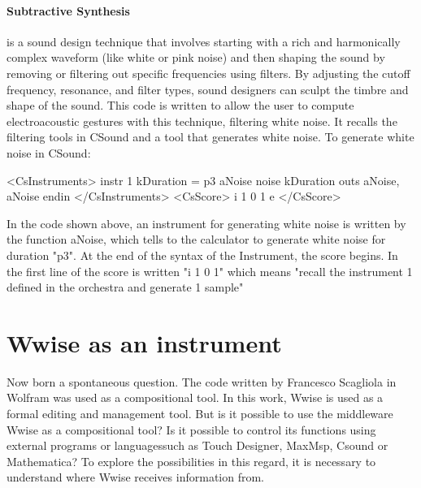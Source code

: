 		\paragraph{Subtractive Synthesis} is a sound design technique that involves starting with a rich and harmonically complex waveform (like white or pink noise) and then shaping the sound by removing or filtering out specific frequencies using filters. By adjusting the cutoff frequency, resonance, and filter types, sound designers can sculpt the timbre and shape of the sound.
		This code is written to allow the user to compute electroacoustic gestures with this technique, filtering white noise. It recalls the filtering tools in CSound and a tool that generates white noise. To generate white noise in CSound:
		
		\newpage
		
		\begin{code}
			<CsInstruments>
			instr 1
			kDuration = p3
			aNoise    noise kDuration
			outs aNoise, aNoise
			endin
			</CsInstruments>
			<CsScore>
			i 1 0 1
			e
			</CsScore>
		\end{code}
		
		In the code shown above, an instrument for generating white noise is written by the function aNoise, which tells to the calculator to generate white noise for duration "p3". At the end of the syntax of the Instrument, the score begins. In the first line of the score is written "i 1 0 1" which means "recall the instrument 1 defined in the orchestra and generate 1 sample"
		
	\section{Wwise as an instrument}
	Now born a spontaneous question. The code written by Francesco Scagliola in Wolfram was used as a compositional tool. In this work, Wwise is used as a formal editing and management tool.
	But is it possible to use the middleware Wwise as a compositional tool? Is it possible to control its functions using external programs or languages ​​such as Touch Designer, MaxMsp, Csound or Mathematica?
	To explore the possibilities in this regard, it is necessary to understand where Wwise receives information from.
	
